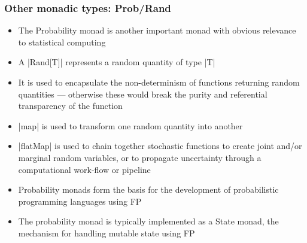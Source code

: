 \documentclass[mathserif,handout]{beamer}
\begin{document}

\begin{frame}[fragile]
  \frametitle{Other monadic types: Prob/Rand}
  \begin{itemize}
  \item The \alert{Probability monad} is another important monad with obvious relevance to statistical computing
  \item A |Rand[T]| represents a random quantity of type |T|
  \item It is used to encapsulate the non-determinism of functions returning random quantities --- otherwise these would break the \alert{purity} and \alert{referential transparency} of the function
  \item |map| is used to transform one random quantity into another
  \item |flatMap| is used to chain together stochastic functions to create joint and/or marginal random variables, or to \alert{propagate uncertainty} through a computational work-flow or pipeline
    \item Probability monads form the basis for the development of \alert{probabilistic programming languages} using FP
    \item The probability monad is typically implemented as a \alert{State monad}, the mechanism for handling mutable state using FP
  \end{itemize}
\end{frame}
\end{document}

